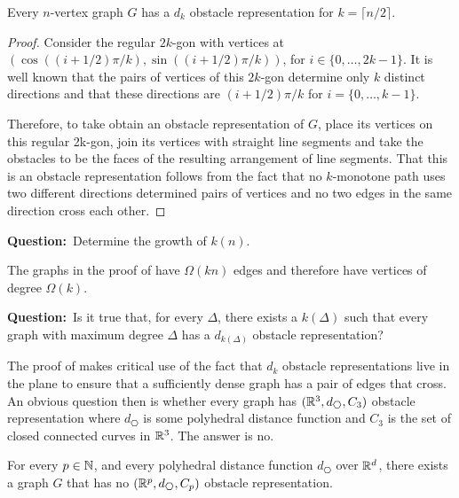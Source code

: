 \documentclass{patmorin}
\newcommand{\question}[1]{\textbf{\color{red}Question:}~#1}
\begin{document}
\begin{thm}
   Every $n$-vertex graph $G$ has a $d_k$ obstacle representation for $k=\lceil n/2\rceil$.
\end{thm}

\begin{proof}
   Consider the regular $2k$-gon with vertices at $(\cos((i+1/2)\pi/k),
   \sin((i+1/2)\pi/k))$, for $i\in\{0,\ldots,2k-1\}$.  It is well known
   that the pairs of vertices of this $2k$-gon determine only $k$
   distinct directions and that these directions are $(i+1/2)\pi/k$
   for $i=\{0,\ldots,k-1\}$.

   Therefore, to take obtain an obstacle representation of $G$, place
   its vertices on this regular 2k-gon, join its vertices with straight
   line segments and take the obstacles to be the faces of the resulting
   arrangement of line segments.  That this is an obstacle representation
   follows from the fact that no $k$-monotone path uses two different
   directions determined pairs of vertices and no two edges in the same
   direction cross each other.
\end{proof}

\question{Determine the growth of $k(n)$.}

The graphs in the proof of  have $\Omega(kn)$
edges and therefore have vertices of degree $\Omega(k)$.  

\question{Is it true that, for every $\Delta$, there exists a $k(\Delta)$ such that every graph with maximum degree $\Delta$ has a $d_{k(\Delta)}$ obstacle representation?}

The proof of  makes critical use of the fact
that $d_k$ obstacle representations live in the plane to ensure that
a sufficiently dense graph has a pair of edges that cross. An obvious
question then is whether every graph has $(\R^3,d_{\hexagon},C_3)$
obstacle representation where $d_{\hexagon}$ is some polyhedral distance
function and $C_3$ is the set of closed connected curves in $\mathbb{R}^3$.
The answer is no.


\begin{thm}
  For every $p\in\mathbb{N}$, and every polyhedral distance function $d_{\hexagon}$ over $\mathbb{R}^d$, there exists a graph $G$ that has no $(\R^p, d_{\hexagon}, C_p)$ obstacle representation.
\end{thm}
\end{document}
